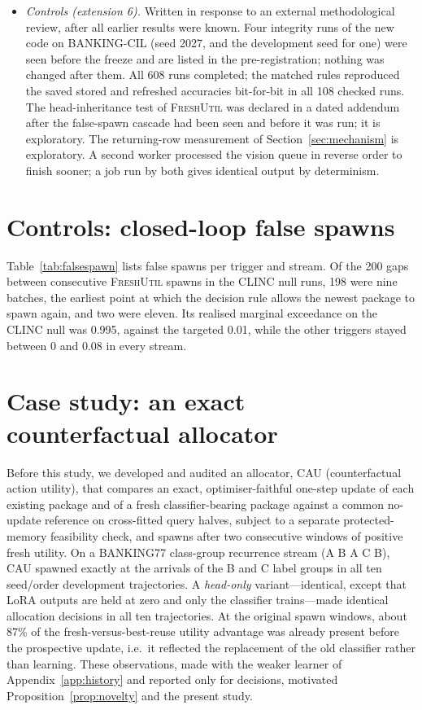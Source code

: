 \documentclass[10pt]{article}
\begin{document}
\begin{itemize}
\item \emph{Controls (extension 6).} Written in response to an external methodological review, after all earlier results were known. Four integrity runs of the new code on BANKING-CIL (seed 2027, and the development seed for one) were seen before the freeze and are listed in the pre-registration; nothing was changed after them. All 608 runs completed; the matched rules reproduced the saved stored and refreshed accuracies bit-for-bit in all 108 checked runs. The head-inheritance test of \textsc{FreshUtil} was declared in a dated addendum after the false-spawn cascade had been seen and before it was run; it is exploratory. The returning-row measurement of Section~\ref{sec:mechanism} is exploratory. A second worker processed the vision queue in reverse order to finish sooner; a job run by both gives identical output by determinism.
\end{itemize}

\section{Controls: closed-loop false spawns}
\label{app:ext6}

Table~\ref{tab:falsespawn} lists false spawns per trigger and stream. Of the 200 gaps between consecutive \textsc{FreshUtil} spawns in the CLINC null runs, 198 were nine batches, the earliest point at which the decision rule allows the newest package to spawn again, and two were eleven. Its realised marginal exceedance on the CLINC null was 0.995, against the targeted 0.01, while the other triggers stayed between 0 and 0.08 in every stream.

\section{Case study: an exact counterfactual allocator}
\label{app:cau}
Before this study, we developed and audited an allocator, CAU (counterfactual action utility), that compares an exact, optimiser-faithful one-step update of each existing package and of a fresh classifier-bearing package against a common no-update reference on cross-fitted query halves, subject to a separate protected-memory feasibility check, and spawns after two consecutive windows of positive fresh utility. On a BANKING77 class-group recurrence stream (A B A C B), CAU spawned exactly at the arrivals of the B and C label groups in all ten seed/order development trajectories. A \emph{head-only} variant---identical, except that LoRA outputs are held at zero and only the classifier trains---made identical allocation decisions in all ten trajectories. At the original spawn windows, about 87\% of the fresh-versus-best-reuse utility advantage was already present before the prospective update, i.e.\ it reflected the replacement of the old classifier rather than learning. These observations, made with the weaker learner of Appendix~\ref{app:history} and reported only for decisions, motivated Proposition~\ref{prop:novelty} and the present study.
\end{document}
